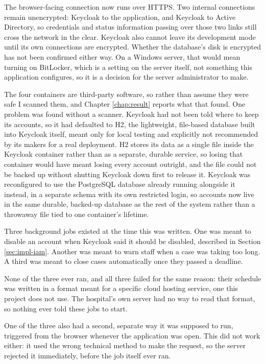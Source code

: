 The browser-facing connection now runs over HTTPS. Two internal connections remain unencrypted: Keycloak to the application, and Keycloak to Active Directory, so credentials and status information passing over those two links still cross the network in the clear. Keycloak also cannot leave its development mode until its own connections are encrypted. Whether the database's disk is encrypted has not been confirmed either way. On a Windows server, that would mean turning on BitLocker, which is a setting on the server itself, not something this application configures, so it is a decision for the server administrator to make.

The four containers are third-party software, so rather than assume they were safe I scanned them, and Chapter \ref{chap:result} reports what that found. One problem was found without a scanner. Keycloak had not been told where to keep its accounts, so it had defaulted to H2, the lightweight, file-based database built into Keycloak itself, meant only for local testing and explicitly not recommended by its makers for a real deployment. H2 stores its data as a single file inside the Keycloak container rather than as a separate, durable service, so losing that container would have meant losing every account outright, and the file could not be backed up without shutting Keycloak down first to release it. Keycloak was reconfigured to use the PostgreSQL database already running alongside it instead, in a separate schema with its own restricted login, so accounts now live in the same durable, backed-up database as the rest of the system rather than a throwaway file tied to one container's lifetime.

Three background jobs existed at the time this was written. One was meant to disable an account when Keycloak said it should be disabled, described in Section \ref{sec:impl-iam}. Another was meant to warn staff when a case was taking too long. A third was meant to close cases automatically once they passed a deadline.

None of the three ever ran, and all three failed for the same reason: their schedule was written in a format meant for a specific cloud hosting service, one this project does not use. The hospital's own server had no way to read that format, so nothing ever told these jobs to start.

One of the three also had a second, separate way it was supposed to run, triggered from the browser whenever the application was open. This did not work either: it used the wrong technical method to make the request, so the server rejected it immediately, before the job itself ever ran.

